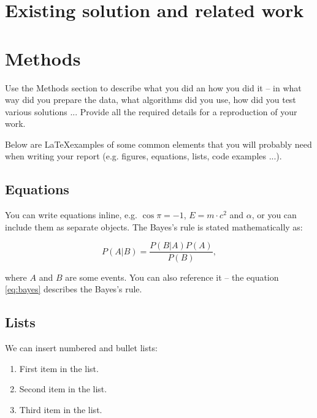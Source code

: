 \documentclass[fleqn,moreauthors,10pt]{ds_report}
\begin{document}
\section*{Existing solution and related work}




\section*{Methods}

Use the Methods section to describe what you did an how you did it -- in what way did you prepare the data, what algorithms did you use, how did you test various solutions ... Provide all the required details for a reproduction of your work.

Below are \LaTeX examples of some common elements that you will probably need when writing your report (e.g. figures, equations, lists, code examples ...).


\subsection*{Equations}

You can write equations inline, e.g. $\cos\pi=-1$, $E = m \cdot c^2$ and $\alpha$, or you can include them as separate objects. The Bayes’s rule is stated mathematically as:

\begin{equation}
	P(A|B) = \frac{P(B|A)P(A)}{P(B)},
	\label{eq:bayes}
\end{equation}

where $A$ and $B$ are some events. You can also reference it -- the equation \ref{eq:bayes} describes the Bayes's rule.

\subsection*{Lists}

We can insert numbered and bullet lists:

\begin{enumerate}[noitemsep] 
	\item First item in the list.
	\item Second item in the list.
	\item Third item in the list.
\end{enumerate}
\end{document}
